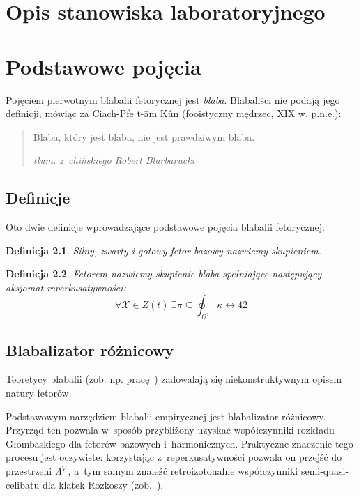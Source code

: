 \documentclass[licencjacka]{pracamgr}
\newtheorem{defi}{Definicja}[section]
\begin{document}
\chapter{Opis stanowiska laboratoryjnego}



\iffalse
\chapter{Podstawowe pojęcia}\label{r:pojecia}

Pojęciem pierwotnym blabalii fetorycznej jest \emph{blaba}.
Blabaliści nie podają jego definicji, mówiąc za Ciach-Pfe t-\=am
K\^un (fooistyczny mędrzec, XIX w. p.n.e.):
\begin{quote}
  Blaba, który jest blaba, nie jest prawdziwym blaba.

\raggedleft\slshape tłum. z~chińskiego Robert Blarbarucki
\end{quote}

\section{Definicje}

Oto dwie definicje wprowadzające podstawowe pojęcia blabalii
fetorycznej:

\begin{defi}\label{skupienie}
  Silny, zwarty i gotowy fetor bazowy nazwiemy \emph{skupieniem}.
\end{defi}

\begin{defi}\label{fetor}
  \emph{Fetorem} nazwiemy skupienie blaba spełniające następujący
  \emph{aksjomat reperkusatywności}:
  $$\forall \mathcal{X}\in Z(t)\ \exists
  \pi\subseteq\oint_{\Omega^2}\kappa\leftrightarrow 42$$
\end{defi}


\section{Blabalizator różnicowy}

Teoretycy blabalii (zob. np. pracę~\cite{grglo}) zadowalają się
niekonstruktywnym opisem natury fetorów.

Podstawowym narzędziem blabalii empirycznej jest blabalizator
różnicowy.  Przyrząd ten pozwala w~sposób przybliżony uzyskać
współczynniki rozkładu Głombaskiego dla fetorów bazowych
i~harmonicznych.  Praktyczne znaczenie tego procesu jest oczywiste:
korzystając z~reperkusatywności pozwala on przejść do przestrzeni
$\Lambda^{\nabla}$, a~tym samym znaleźć retroizotonalne współczynniki
semi-quasi-celibatu dla klatek Rozkoszy (zob.~\cite{JR}).
\end{document}
